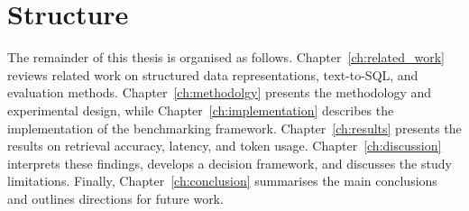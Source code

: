 \section{Structure}

The remainder of this thesis is organised as follows. Chapter~\ref{ch:related_work} reviews related work on
structured data representations, text-to-SQL, and evaluation methods. Chapter~\ref{ch:methodolgy} presents
the methodology and experimental design, while Chapter~\ref{ch:implementation} describes the implementation
of the benchmarking framework. Chapter~\ref{ch:results} presents the results on retrieval accuracy, latency,
and token usage. Chapter~\ref{ch:discussion} interprets these findings, develops a decision framework, and
discusses the study limitations. Finally, Chapter~\ref{ch:conclusion} summarises the main conclusions and
outlines directions for future work.
